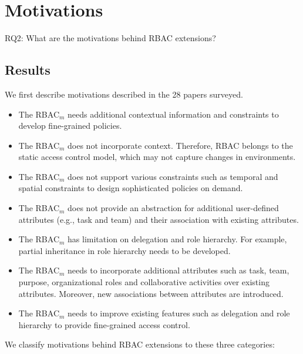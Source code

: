 \section{Motivations} \label{sec:motivations}

RQ2: What are the motivations behind RBAC extensions?

\subsection{Results}

We first describe motivations described in the 28 papers surveyed.

\begin{itemize}
\setlength{\itemsep}{0.25pt}
\item The RBAC$_{m}$ needs additional contextual information and constraints to develop fine-grained policies.
\item The RBAC$_{m}$ does not incorporate context. Therefore, RBAC belongs to the static access control model, which may not capture changes in environments.
\item The RBAC$_{m}$ does not support various constraints such as temporal and spatial constraints to design sophisticated policies on demand.
\item The RBAC$_{m}$ does not provide an abstraction for additional user-defined attributes	(e.g., task and team) and their association with existing attributes.
\item The RBAC$_{m}$ has limitation on delegation and role hierarchy. For example, partial inheritance in role hierarchy needs to be developed.  
\item The RBAC$_{m}$ needs to incorporate additional attributes such as
task, team, purpose, organizational roles and collaborative activities over existing attributes. Moreover, new associations between attributes
are introduced. 
\item The RBAC$_{m}$ needs to improve existing features such as delegation and role hierarchy to provide fine-grained access control. 
\end{itemize}


We classify motivations behind RBAC extensions to these three categories:

